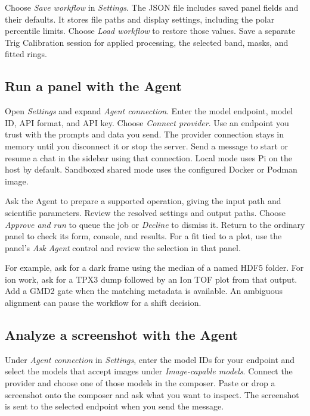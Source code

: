 \documentclass[11pt,a4paper]{article}
\begin{document}
Choose \emph{Save workflow} in \emph{Settings}. The JSON file includes
saved panel fields and their defaults. It stores file paths and display
settings, including the polar percentile limits.
Choose \emph{Load workflow} to restore those values.
Save a separate Trig Calibration session for applied processing, the
selected band, masks, and fitted rings.

\subsection{Run a panel with the Agent}

Open \emph{Settings} and expand \emph{Agent connection}. Enter the model endpoint,
model ID, API format, and API key. Choose \emph{Connect provider}.
Use an endpoint you trust with the prompts and data you send. The provider
connection stays in memory until you disconnect it or stop the server.
Send a message to start or resume a chat in the sidebar using that connection.
Local mode uses Pi on the host by default. Sandboxed shared mode uses the
configured Docker or Podman image.

Ask the Agent to prepare a supported operation, giving the input path and
scientific parameters. Review the resolved settings and output paths.
Choose \emph{Approve and run} to queue the job or \emph{Decline} to dismiss
it. Return to the ordinary panel to check its form, console, and results.
For a fit tied to a plot, use the panel's \emph{Ask Agent} control and
review the selection in that panel.

For example, ask for a dark frame using the median of a named HDF5 folder.
For ion work, ask for a TPX3 dump followed by an Ion TOF plot from that
output. Add a GMD2 gate when the matching metadata is available. An
ambiguous alignment can pause the workflow for a shift decision.

\subsection{Analyze a screenshot with the Agent}

Under \emph{Agent connection} in \emph{Settings}, enter the model IDs for your endpoint and select
the models that accept images under \emph{Image-capable models}. Connect the
provider and choose one of those models in the composer. Paste or drop a
screenshot onto the composer and ask what you want to inspect. The screenshot
is sent to the selected endpoint when you send the message.
\end{document}
